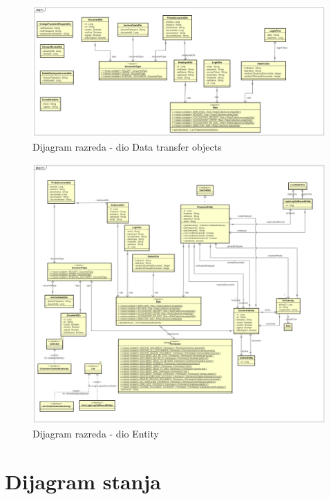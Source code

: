 			\begin{figure}[H]
				\includegraphics[scale=0.3]{slike/DtoDiagram.png} %
				\centering
				\caption{Dijagram razreda - dio Data transfer objects}
				\label{fig:promjene}
			\end{figure}

			\begin{figure}[H]
				\includegraphics[scale=0.3]{slike/EntityDiagram.png} %
				\centering
				\caption{Dijagram razreda - dio Entity}
				\label{fig:promjene}
			\end{figure}
			
			
			
			\eject
		

		\section{Dijagram stanja}
			
